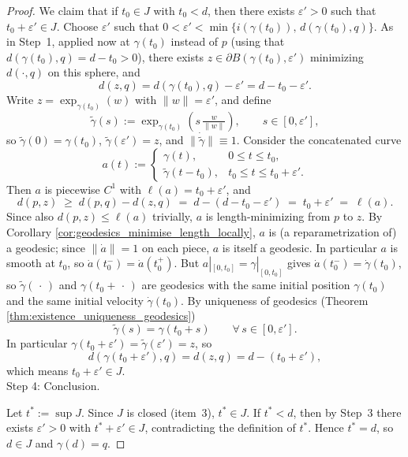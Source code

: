\begin{proof}
We claim that if $t_0 \in J$ with $t_0 < d$, then there exists $\varepsilon' > 0$ such that $t_0 + \varepsilon' \in J$. Choose $\varepsilon'$ such that $0 < \varepsilon' < \min\{i(\gamma(t_0)),\, d(\gamma(t_0), q)\}$. As in Step~1, applied now at $\gamma(t_0)$ instead of $p$ (using that $d(\gamma(t_0),q) = d - t_0 > 0$), there exists $z \in \partial B(\gamma(t_0), \varepsilon')$ minimizing $d(\cdot, q)$ on this sphere, and
\[
d(z, q) = d(\gamma(t_0), q) - \varepsilon' = d - t_0 - \varepsilon'.
\]
Write $z = \exp_{\gamma(t_0)}(w)$ with $\|w\| = \varepsilon'$, and define
\[
\tilde{\gamma}(s) := \exp_{\gamma(t_0)}\!\left(s\,\tfrac{w}{\|w\|}\right), \qquad s \in [0, \varepsilon'],
\]
so $\tilde{\gamma}(0) = \gamma(t_0)$, $\tilde{\gamma}(\varepsilon') = z$, and $\|\dot{\tilde{\gamma}}\| \equiv 1$. Consider the concatenated curve
\[
a(t) := \begin{cases} \gamma(t), & 0 \leqslant t \leqslant t_0, \\ \tilde{\gamma}(t - t_0), & t_0 \leqslant t \leqslant t_0 + \varepsilon'. \end{cases}
\]
Then $a$ is piecewise $C^1$ with $\ell(a) = t_0 + \varepsilon'$, and
\[
d(p, z) \;\geqslant\; d(p,q) - d(z,q) \;=\; d - (d - t_0 - \varepsilon') \;=\; t_0 + \varepsilon' \;=\; \ell(a).
\]
Since also $d(p,z) \leqslant \ell(a)$ trivially, $a$ is length-minimizing from $p$ to $z$. 
By Corollary \ref{cor:geodesics_minimise_length_locally}, $a$ is (a reparametrization of) a geodesic; since $\|\dot a\| = 1$ on each piece, $a$ is itself a geodesic. In particular $a$ is smooth at $t_0$, so $\dot{a}(t_0^-) = \dot{a}(t_0^+)$. But $a|_{[0,t_0]} = \gamma|_{[0,t_0]}$ gives $\dot a(t_0^-) = \dot\gamma(t_0)$, so $\tilde\gamma(\,\cdot\,)$ and $\gamma(t_0 + \,\cdot\,)$ are geodesics with the same initial position $\gamma(t_0)$ and the same initial velocity $\dot\gamma(t_0)$. By uniqueness of geodesics (Theorem \ref{thm:existence_uniqueness_geodesics})
\[
\tilde\gamma(s) = \gamma(t_0 + s) \qquad \forall\, s \in [0, \varepsilon'].
\]
In particular $\gamma(t_0 + \varepsilon') = \tilde\gamma(\varepsilon') = z$, so
\[
d(\gamma(t_0 + \varepsilon'), q) = d(z, q) = d - (t_0 + \varepsilon'),
\]
which means $t_0 + \varepsilon' \in J$.\\
 
Step 4: Conclusion.

Let $t^* := \sup J$. Since $J$ is closed (item~3), $t^* \in J$. If $t^* < d$, then by Step~3 there exists $\varepsilon' > 0$ with $t^* + \varepsilon' \in J$, contradicting the definition of $t^*$. Hence $t^* = d$, so $d \in J$ and $\gamma(d) = q$.
\end{proof}








